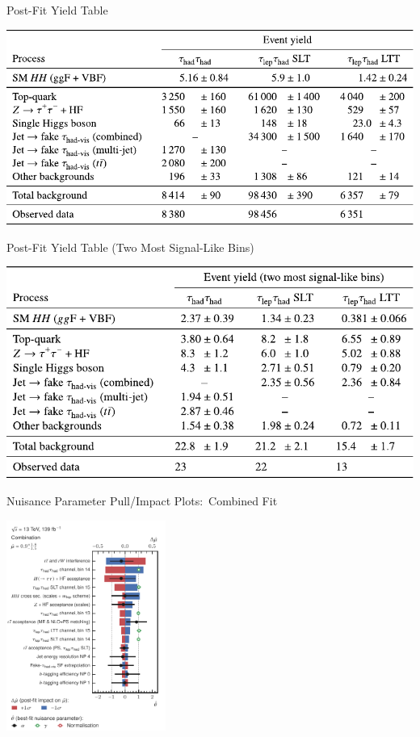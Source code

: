 \documentclass[11pt, xcolor={dvipsnames}, aspectratio=169]{beamer}
\begin{document}

\begin{frame}{Post-Fit Yield Table}
  \centering

  \includegraphics[scale=0.9]{yieldtable_postfit}
\end{frame}


\begin{frame}{Post-Fit Yield Table (Two Most Signal-Like Bins)}
  \centering

  \includegraphics[scale=0.9]{backup/yield_tables_signallike}
\end{frame}


\begin{frame}{Nuisance Parameter Pull/Impact Plots:\ Combined Fit}
  \centering

  \includegraphics[width=0.39\textwidth]{results_nonres/rankings/ranking_nonres_combined}
\end{frame}
\end{document}

